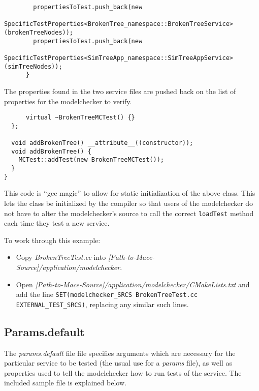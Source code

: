 \documentclass[12pt,letterpaper]{article}
\newenvironment{code}
{\begin{list}{}{\setlength{\leftmargin}{1em}}\item\scriptsize\bfseries}
{\end{list}}
\begin{document}
\begin{code}
\begin{verbatim} 
        propertiesToTest.push_back(new 
             SpecificTestProperties<BrokenTree_namespace::BrokenTreeService>(brokenTreeNodes));
        propertiesToTest.push_back(new 
             SpecificTestProperties<SimTreeApp_namespace::SimTreeAppService>(simTreeNodes));
      }
\end{verbatim}
\end{code}

The properties found in the two service files are pushed back on the list of properties for the modelchecker to verify.

\begin{code}
\begin{verbatim} 
      virtual ~BrokenTreeMCTest() {}
  };

  void addBrokenTree() __attribute__((constructor));
  void addBrokenTree() {
    MCTest::addTest(new BrokenTreeMCTest());
  }
}
\end{verbatim}
\end{code}

This code is ``gcc magic'' to allow for static initialization of the above class.  This lets the class be initialized by the compiler so that users of the modelchecker do not have to alter the modelchecker's source to call the correct \texttt{loadTest} method each time they test a new service.

To work through this example:
\begin{itemize}
\item Copy \emph{BrokenTreeTest.cc} into \emph{[Path-to-Mace-Source]/application/modelchecker}.
\item Open \emph{[Path-to-Mace-Source]/application/modelchecker/CMakeLists.txt} and add the line \texttt{SET(modelchecker\_SRCS BrokenTreeTest.cc {EXTERNAL\_TEST\_SRCS})}, replacing any similar such lines.
\end{itemize}

\subsection{Params.default}
\label{Params.default}
The \emph{params.default} file file specifies arguments which are necessary for the particular service to be tested (the usual use for a \emph{params} file), as well as properties used to tell the modelchecker how to run tests of the service.  The included sample file is explained below.
\end{document}
